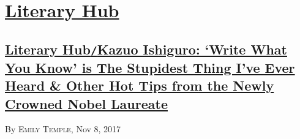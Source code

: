 \documentclass[oneside]{book}
\numberwithin{equation}{section}
\begin{document}

\chapter{\href{https://lithub.com/}{Literary Hub}}

\section{\href{https://lithub.com/kazuo-ishiguro-write-what-you-know-is-the-stupidest-thing-ive-ever-heard/}{Literary Hub\texttt{/}Kazuo Ishiguro: `Write What You Know' is The Stupidest Thing I've Ever Heard \& Other Hot Tips from the Newly Crowned Nobel Laureate}}
\hfill By \textsc{Emily Temple}, Nov 8, 2017
\end{document}

